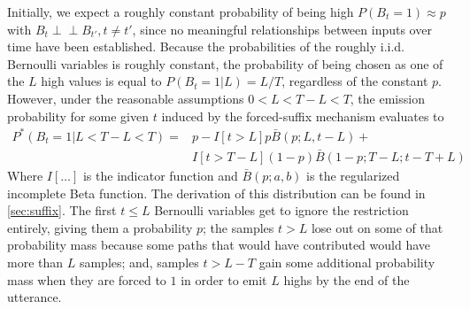 \documentclass{article}
\newcommand{\ind}{\perp\!\!\!\!\perp}
\begin{document}
Initially, we expect a roughly constant probability of being high $P(B_t=1)
\approx p$ with $B_t \ind B_{t'}, t \neq t'$, since no meaningful relationships
between inputs over time have been established. Because the probabilities of
the roughly i.i.d. Bernoulli variables is roughly constant, the probability of
being chosen as one of the $L$ high values is equal to $P(B_t=1|L) = L / T$,
regardless of the constant $p$. However, under the reasonable assumptions $0 <
L < T - L < T$, the emission probability for some given $t$ induced by the
forced-suffix mechanism evaluates to
%
\begin{equation} \label{eq:iid_suffix_dist}
\begin{split}
    P^*(B_t=1|L < T - L < T)
        =& p - I[t > L]p\bar{B}(p; L, t - L) + \\
        &  I[t > T - L](1 - p)\bar{B}(1 - p; T - L; t - T + L)
\end{split}
\end{equation}
%
Where $I[\ldots]$ is the indicator function and $\bar{B}(p; a, b)$ is the
regularized incomplete Beta function. The derivation of this distribution can
be found in \cref{sec:suffix}. The first $t \leq L$ Bernoulli variables
get to ignore the restriction entirely, giving them a probability $p$; the
samples $t > L$ lose out on some of that probability mass because some paths
that would have contributed would have more than $L$ samples; and, samples
$t > L - T$ gain some additional probability mass when they are forced to $1$
in order to emit $L$ highs by the end of the utterance.
\end{document}
